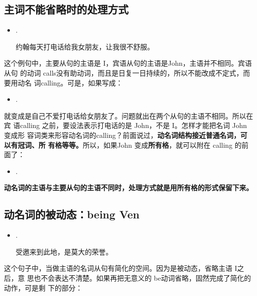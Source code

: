 \subsection{主词不能省略时的处理方式}

\begin{itemize}
\item {}  .

约翰每天打电话给我女朋友，让我很不舒服。
\end{itemize}

这个例句中，主要从句的主语是 I，宾语从句的主语是John，主语并不相同。宾语从句
的动词 calls没有助动词，而且是日复一日持续的，所以不能改成不定式，而要用动名
词calling。可是，如果写成：

\begin{itemize}
\item {}  .
\end{itemize}

就变成是自己不爱打电话给女朋友了。问题就出在两个从句的主语不相同。所以在宾
语calling 之前，要设法表示打电话的是 John，不是 I。怎样才能把名词 John变成形
容词类来形容动名词的calling？前面说过，\textbf{动名词结构接近普通名词，可以有冠词、所
有格等等。}所以，如果John 变成\textbf{所有格}，就可以附在 calling 的前面了：

\begin{itemize}
\item {}  .
\end{itemize}

\textbf{动名词的主语与主要从句的主语不同时，处理方式就是用所有格的形式保留下来。}

\subsection{动名词的被动态：being Ven}

\begin{itemize}
\item {}  .

  受邀来到此地，是莫大的荣誉。
\end{itemize}

这个句子中，当做主语的名词从句有简化的空间。因为是被动态，省略主语 I之后，意
思也不会表达不清楚。如果再把无意义的 be动词省略，固然完成了简化的动作，可是剩
下的部分：

